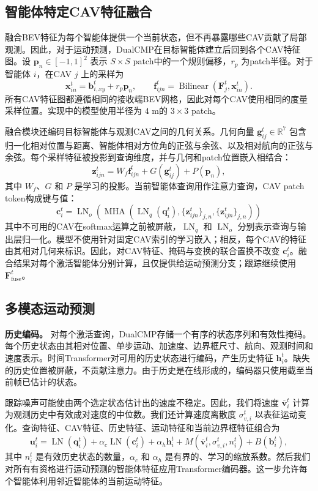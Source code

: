 \documentclass[lettersize,journal]{IEEEtran}
\begin{document}
\subsection{智能体特定CAV特征融合}

融合BEV特征为每个智能体提供一个当前状态，但不再暴露哪些CAV贡献了局部观测。因此，对于运动预测，DualCMP在目标智能体建立后回到各个CAV特征图。设 \(\mathbf{p}_n\in[-1,1]^2\) 表示 \(S\times S\) patch中的一个规则偏移，\(r_p\) 为patch半径。对于智能体 \(i\)，在CAV \(j\) 上的采样为
\[
\mathbf{x}_{in}^t=\mathbf{b}_{i,xy}^t+r_p\mathbf{p}_n,
\qquad
\mathbf{f}_{ijn}^t=
\operatorname{Bilinear}\!\left(\mathbf{F}_j^t,\mathbf{x}_{in}^t\right).
\tag{5}
\]
所有CAV特征图都遵循相同的接收端BEV网格，因此对每个CAV使用相同的度量采样位置。实现中的模型使用半径为 \(4\) m的 \(3\times3\) patch。

融合模块还编码目标智能体与观测CAV之间的几何关系。几何向量 \(\mathbf{g}_{ij}^t\in\mathbb{R}^{7}\) 包含归一化相对位置与距离、智能体相对方位角的正弦与余弦、以及相对航向的正弦与余弦。每个采样特征被投影到查询维度，并与几何和patch位置嵌入相结合：
\[
\mathbf{z}_{ijn}^t=
W_f\mathbf{f}_{ijn}^t
+G(\mathbf{g}_{ij}^t)
+P(\mathbf{p}_n),
\tag{6}
\]
其中 \(W_f\)、\(G\) 和 \(P\) 是学习的投影。当前智能体查询用作注意力查询，CAV patch token构成键与值：
\[
\mathbf{c}_i^t=
\operatorname{LN}_{o}\!\left(
\operatorname{MHA}
\left(
\operatorname{LN}_{q}(\mathbf{q}_i^t),
\{\mathbf{z}_{ijn}^t\}_{j,n},
\{\mathbf{z}_{ijn}^t\}_{j,n}
\right)
\right)
\tag{7}
\]
其中不可用的CAV在softmax运算之前被屏蔽，\(\operatorname{LN}_{q}\) 和 \(\operatorname{LN}_{o}\) 分别表示查询与输出层归一化。模型不使用针对固定CAV索引的学习嵌入；相反，每个CAV的特征由其相对几何来标识。因此，对CAV特征、掩码与变换的联合置换不改变 \(\mathbf{c}_i^t\)。融合结果对每个激活智能体分别计算，且仅提供给运动预测分支；跟踪继续使用 \(\mathbf{F}_{\mathrm{fuse}}^t\)。

\subsection{多模态运动预测}

\textbf{历史编码。} 对每个激活查询，DualCMP存储一个有序的状态序列和有效性掩码。每个历史状态由其相对位置、单步运动、加速度、边界框尺寸、航向、观测时间和速度表示。时间Transformer对可用的历史状态进行编码，产生历史特征 \(\mathbf{h}_i^t\)。缺失的历史位置被屏蔽，不贡献注意力。由于历史是在线形成的，编码器只使用截至当前帧已估计的状态。

跟踪噪声可能使由两个选定状态估计出的速度不稳定。因此，我们将速度 \(\overline{\mathbf{v}}_i^t\) 计算为观测历史中有效成对速度的中位数。我们还计算速度离散度 \(\sigma_{v,i}^t\) 以表征运动变化。查询特征、CAV特征、历史特征、运动特征和当前边界框特征组合为
\[
\mathbf{u}_i^t=
\operatorname{LN}(\mathbf{q}_i^t)
+\alpha_c\operatorname{LN}(\mathbf{c}_i^t)
+\alpha_h\mathbf{h}_i^t
+M(\overline{\mathbf{v}}_i^t,\sigma_{v,i}^t,n_i^t)
+B(\mathbf{b}_i^t),
\tag{8}
\]
其中 \(n_i^t\) 是有效历史状态的数量，\(\alpha_c\) 和 \(\alpha_h\) 是有界的、学习的缩放系数。然后我们对所有有资格进行运动预测的智能体特征应用Transformer编码器。这一步允许每个智能体利用邻近智能体的当前运动特征。
\end{document}
